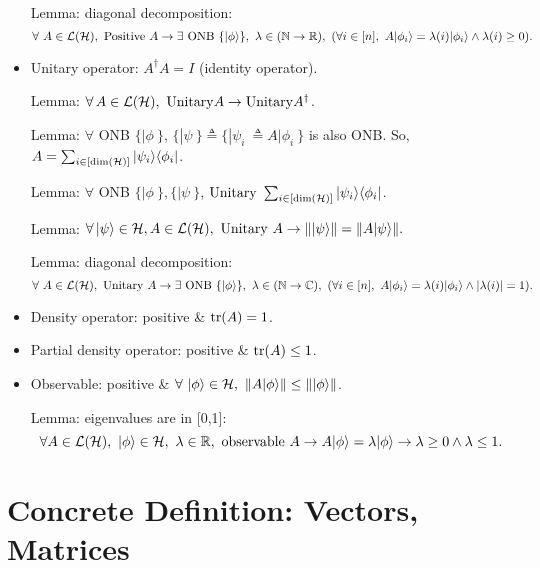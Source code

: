 \begin{itemize}
     Lemma: diagonal decomposition: $$\forall\ A\in{\mathcal{L}}({\mathcal{H}}),\ {\operatorname{Positive}}\ A \rightarrow \exists\ {\operatorname{ONB}}\ \{|\phi\rangle\},\ \lambda\in ({\mathbb{N}}\rightarrow{\mathbb{R}}),\ (\forall i\in[n],\ A|\phi_i\rangle = \lambda(i) |\phi_i\rangle \wedge \lambda(i) \ge 0).$$
    
    \item Unitary operator: $A^\dag A = I$ (identity operator).
    
    Lemma: $\forall\,A\in\cL(\cH),\ \op{Unitary} A \rightarrow \op{Unitary} A^\dag$.
    
    Lemma: $\forall$ ONB $\{|\phi\>\}$, $\{|\psi\>\}\triangleq \{|\psi_i\>\triangleq A|\phi_i\>\}$ is also ONB. So, $A = \sum_{i\in[\dim({\mathcal{H}})]}|\psi_i\rangle\langle\phi_i|$.
    
    Lemma: $\forall$ ONB $\{|\phi\>\}, \{|\psi\>\}$, $\op{Unitary}\ \sum_{i\in[\dim(\cH)]}|\psi_i\>\<\phi_i|$.
    
    Lemma: $\forall\,|\psi\rangle\in{\mathcal{H}}, A\in{\mathcal{L}}({\mathcal{H}}),\ {\operatorname{Unitary}}\ A \rightarrow \||\psi\rangle\| = \|A|\psi\rangle\|.$     
    
    Lemma: diagonal decomposition: $$\forall\ A\in\cL(\cH),\ \op{Unitary}\ A \rightarrow \exists\ \op{ONB}\ \{|\phi\>\},\ \lambda\in (\nat\rightarrow\complexnumber),\ (\forall i\in[n],\ A|\phi_i\> = \lambda(i) |\phi_i\> \wedge |\lambda(i)| = 1).$$
    
    \item Density operator: positive \& ${\mathrm{tr}}(A) = 1$.
    
    \item Partial density operator: positive \& ${\mathrm{tr}}(A)\le 1$.
    \item Observable: positive \& $\forall\ |\phi\>\in\cH,\ \|A|\phi\>\|\le\||\phi\>\|$.
    
    Lemma: eigenvalues are in [0,1]: $$\forall A\in{\mathcal{L}}({\mathcal{H}}),\ |\phi\rangle\in{\mathcal{H}}, \ \lambda\in{\mathbb{R}},\ {\operatorname{observable}}\ A \rightarrow A|\phi\rangle = \lambda|\phi\rangle \rightarrow \lambda\ge 0 \wedge \lambda\le 1.$$
    
\end{itemize}

\section{Concrete Definition: Vectors, Matrices}

